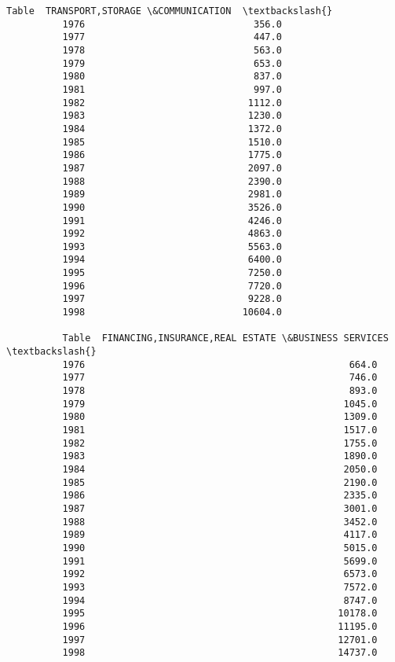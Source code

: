 \documentclass[11pt]{article}
\begin{document}
\begin{Verbatim}[commandchars=\\\{\}]
          Table  TRANSPORT,STORAGE \&COMMUNICATION  \textbackslash{}
          1976                              356.0   
          1977                              447.0   
          1978                              563.0   
          1979                              653.0   
          1980                              837.0   
          1981                              997.0   
          1982                             1112.0   
          1983                             1230.0   
          1984                             1372.0   
          1985                             1510.0   
          1986                             1775.0   
          1987                             2097.0   
          1988                             2390.0   
          1989                             2981.0   
          1990                             3526.0   
          1991                             4246.0   
          1992                             4863.0   
          1993                             5563.0   
          1994                             6400.0   
          1995                             7250.0   
          1996                             7720.0   
          1997                             9228.0   
          1998                            10604.0   
          
          Table  FINANCING,INSURANCE,REAL ESTATE \&BUSINESS SERVICES  \textbackslash{}
          1976                                               664.0    
          1977                                               746.0    
          1978                                               893.0    
          1979                                              1045.0    
          1980                                              1309.0    
          1981                                              1517.0    
          1982                                              1755.0    
          1983                                              1890.0    
          1984                                              2050.0    
          1985                                              2190.0    
          1986                                              2335.0    
          1987                                              3001.0    
          1988                                              3452.0    
          1989                                              4117.0    
          1990                                              5015.0    
          1991                                              5699.0    
          1992                                              6573.0    
          1993                                              7572.0    
          1994                                              8747.0    
          1995                                             10178.0    
          1996                                             11195.0    
          1997                                             12701.0    
          1998                                             14737.0    
          

\end{Verbatim}
\end{document}

